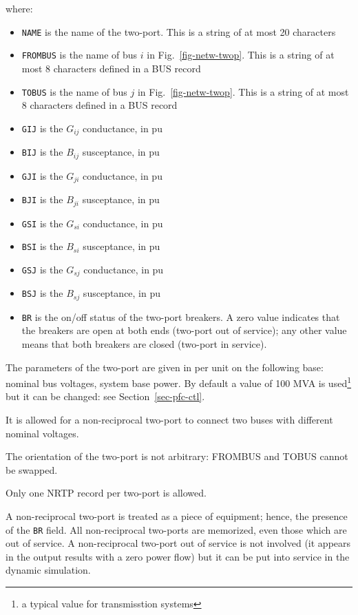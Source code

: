 where:
\begin{itemize}
\item {\tt NAME} is the name of the two-port.  This is a string of at most 20 characters
\item {\tt FROMBUS} is the name of bus $i$ in Fig.~\ref{fig-netw-twop}. This is a string of at most 8 characters defined in a BUS record
\item {\tt TOBUS} is the name of bus $j$ in Fig.~\ref{fig-netw-twop}. This is a string of at most 8 characters defined in a BUS record
\item{\tt GIJ} is the $G_{ij}$ conductance, in pu
\item{\tt BIJ} is the $B_{ij}$ susceptance, in pu
\item{\tt GJI} is the $G_{ji}$ conductance, in pu
\item{\tt BJI} is the $B_{ji}$ susceptance, in pu
\item{\tt GSI} is the $G_{si}$ conductance, in pu
\item{\tt BSI} is the $B_{si}$ susceptance, in pu
\item{\tt GSJ} is the $G_{sj}$ conductance, in pu
\item{\tt BSJ} is the $B_{sj}$ susceptance, in pu
\item{\tt BR} is the on/off status of the two-port breakers. A zero value indicates that the breakers are open at both ends (two-port out of service); any other value means that both breakers are closed (two-port in service).
\end{itemize}

The parameters of the two-port are given in per unit on the following base: nominal bus voltages, system base power. By default a value of 100 MVA is used\footnote{a typical value for transmisstion systems} but it can be changed: see Section~\ref{sec-pfc-ctl}.

It is allowed for a non-reciprocal two-port to connect two buses with different nominal voltages.

The orientation of the two-port is not arbitrary: FROMBUS and TOBUS cannot be swapped.

Only one NRTP record per two-port is allowed.

A non-reciprocal two-port is treated as a piece of equipment; hence, the presence of the {\tt BR} field. All non-reciprocal two-ports are memorized, even those which are out of service. A non-reciprocal two-port out of service is not involved (it appears in the output results with a zero power flow) but it can be put into service in the dynamic simulation.

